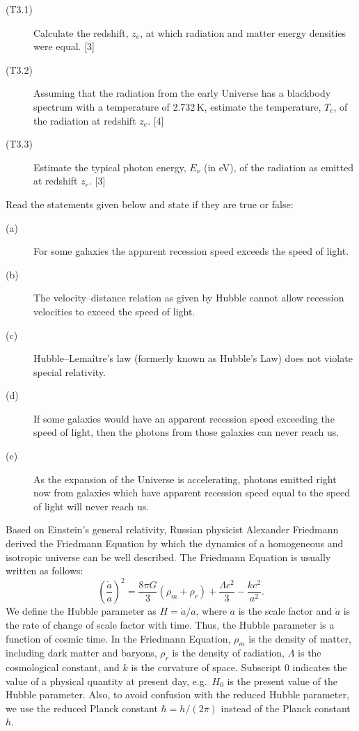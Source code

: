 \begin{description}
\item[(T3.1)] Calculate the redshift, $z_e$, at which radiation and matter
  energy densities were equal. \hfill[3]
\item[(T3.2)] Assuming that the radiation from the early Universe has a
  blackbody spectrum with a temperature of 2.732\,K, estimate the
  temperature, $T_e$, of the radiation at redshift $z_e$. \hfill[4]
\item[(T3.3)] Estimate the typical photon energy, $E_\nu$ (in eV), of the
  radiation as emitted at redshift $z_e$. \hfill[3]
\end{description}

Read the statements given below and state if they are true or false:

\begin{description}
\item[(a)] For some galaxies the apparent recession speed exceeds the speed of
  light.
\item[(b)] The velocity--distance relation as given by Hubble cannot allow
  recession velocities to exceed the speed of light.
\item[(c)] Hubble--Lema\^itre's law (formerly known as Hubble's Law) does not
  violate special relativity.
\item[(d)] If some galaxies would have an apparent recession speed exceeding
  the speed of light, then the photons from those galaxies can never reach us.
\item[(e)] As the expansion of the Universe is accelerating, photons emitted
  right now from galaxies which have apparent recession speed equal to the
  speed of light will never reach us.
\end{description}

Based on Einstein's general relativity, Russian physicist Alexander Friedmann
derived the Friedmann Equation by which the dynamics of a homogeneous and
isotropic universe can be well described. The Friedmann Equation is usually
written as follows:
\[
\left(\frac{\dot{a}}{a}\right)^2
  = \frac{8\pi G}{3}(\rho_m + \rho_r) + \frac{\Lambda c^2}{3}
    - \frac{kc^2}{a^2}.
\]
We define the Hubble parameter as $H = \dot{a}/a$, where $a$ is the scale
factor and $\dot{a}$ is the rate of change of scale factor with time. Thus,
the Hubble parameter is a function of cosmic time. In the Friedmann Equation,
$\rho_m$ is the density of matter, including dark matter and baryons,
$\rho_r$ is the density of radiation, $\Lambda$ is the cosmological constant,
and $k$ is the curvature of space. Subscript 0 indicates the value of a
physical quantity at present day, e.g.\ $H_0$ is the present value of the
Hubble parameter. Also, to avoid confusion with the reduced Hubble parameter,
we use the reduced Planck constant $\hbar = h/(2\pi)$ instead of the Planck
constant $h$.

